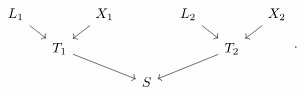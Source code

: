 \[
\begin{tikzcd}[column sep=small,row sep=small]
  L_1
    \arrow[dr]
  &&
  X_1
    \arrow[dl]
  &&
  L_2
    \arrow[dr]
  &&
  X_2
    \arrow[dl]
  \\
  {}
  &
  T_1
    \arrow[drr]
  &&
  {}
  &&
  T_2
    \arrow[dll]
  &
  {}
  \\
  {}
  &&
  {}
  &
  S
  &&
  {}
  &
  {}
\end{tikzcd}
\,.
\]
